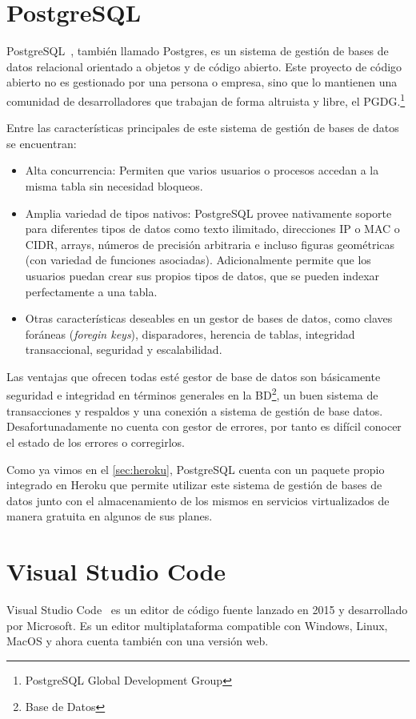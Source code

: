 \documentclass[a4paper, 12pt]{book}
\begin{document}
\section{PostgreSQL}
\label{sec:postgeSQL}
PostgreSQL~\cite{postgresql}, también llamado Postgres, es un sistema de gestión de bases de datos relacional orientado a objetos y de código abierto. Este proyecto de código abierto no es gestionado por una persona o empresa, sino que lo mantienen una comunidad de desarrolladores que trabajan de forma altruista y libre, el PGDG.\footnote{PostgreSQL Global Development Group}

Entre las características principales de este sistema de gestión de bases de datos se encuentran: 
\begin{itemize}
	\item Alta concurrencia: Permiten que varios usuarios o procesos accedan a la misma tabla sin necesidad bloqueos. 
	\item Amplia variedad de tipos nativos: PostgreSQL provee nativamente soporte para diferentes tipos de datos como texto ilimitado, direcciones IP o MAC o CIDR, arrays, números de precisión arbitraria e incluso figuras geométricas (con variedad de funciones asociadas). Adicionalmente permite que los usuarios puedan crear sus propios tipos de datos, que se pueden indexar perfectamente a una tabla. 
	\item Otras características deseables en un gestor de bases de datos, como claves foráneas (\emph{foregin keys}), disparadores, herencia de tablas, integridad transaccional, seguridad y escalabilidad.  
\end{itemize}
Las ventajas que ofrecen todas esté gestor de base de datos son básicamente seguridad e integridad en términos generales en la BD\footnote{Base de Datos}, un buen sistema de transacciones y respaldos y una conexión a sistema de gestión de base datos. Desafortunadamente no cuenta con gestor de errores, por tanto es difícil conocer el estado de los errores o corregirlos. 

Como ya vimos en el \ref{sec:heroku}, PostgreSQL cuenta con un paquete propio integrado en Heroku que permite utilizar este sistema de gestión de bases de datos junto con el almacenamiento de los mismos en servicios virtualizados de manera gratuita en algunos de sus planes.  

\section{Visual Studio Code}
Visual Studio Code~\cite{vscode} es un editor de código fuente lanzado en 2015 y desarrollado por Microsoft. Es un editor multiplataforma compatible con Windows, Linux, MacOS y ahora cuenta también con una versión web. 
\end{document}
